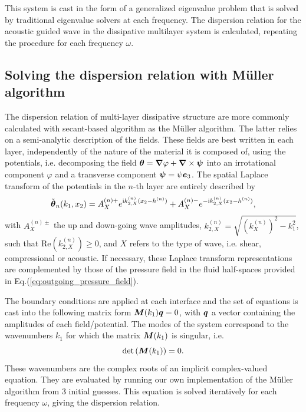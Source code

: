 This system is cast in the form of a generalized eigenvalue problem that is solved by traditional eigenvalue solvers at each frequency. The dispersion relation for the acoustic guided wave in the dissipative multilayer system is calculated, repeating the procedure for each frequency $\omega$.
    
\subsection{Solving the dispersion relation with M\"uller algorithm}
    \label{subsec:semi_a}

The dispersion relation of multi-layer dissipative structure are more commonly calculated with secant-based algorithm as the M\"uller algorithm. The latter relies on a semi-analytic description of the fields. These fields are best written in each layer, independently of the nature of the material it is composed of, using the potentials, i.e. decomposing the field $\boldsymbol \theta = \boldsymbol \nabla \varphi + \boldsymbol \nabla \times \boldsymbol \psi$ into an irrotational component $\varphi$ and a transverse component $\boldsymbol \psi=\psi \boldsymbol e_3$. The spatial Laplace transform of the potentials in the $n$-th layer are entirely described by
    \begin{equation}
        \tilde { \boldsymbol \theta}_n ( k_1, x_2) =  A^{(n)+}_{X} e^{\mathrm i  k_{2,X}^{(n)}(x_2 - h^{(n)})} + A^{(n)-}_{X} e^{-\mathrm i  k_{2,X}^{(n)} (x_2 - h^{(n)})}, 
    \end{equation}
with $ A^{(n)\pm}_{X}$ the up and down-going wave amplitudes, $k_{2,X}^{(n)}=\sqrt{\left(k_{X}^{(n)}\right)^2-k_1^2}$, such that $\textrm{Re}\left( k_{2,X}^{(n)}\right)\geq 0$, and $X$ refers to the type of wave, i.e. shear, compressional or acoustic. If necessary, these Laplace transform representations are complemented by those of the pressure field in the fluid half-spaces provided in Eq.(\ref{eq:outgoing_pressure_field}).

The boundary conditions are applied at each interface and the set of equations is cast into the following matrix form $\boldsymbol M( k_1) \boldsymbol q = 0$, with $ \boldsymbol q$ a vector containing the amplitudes of each field/potential. The modes of the system correspond to the wavenumbers $ k_1$ for which the matrix $\boldsymbol M( k_1)$ is singular, i.e.
    \begin{equation}
        \text{det}\left( \boldsymbol M( k_1)\right) = 0.
        \label{eq:det_M}
    \end{equation}
These wavenumbers are the complex roots of an implicit complex-valued equation. They are evaluated by running our own implementation of the Müller algorithm \cite{muller1956} from 3 initial guesses. This equation is solved iteratively for each frequency $\omega$, giving the dispersion relation.
    

